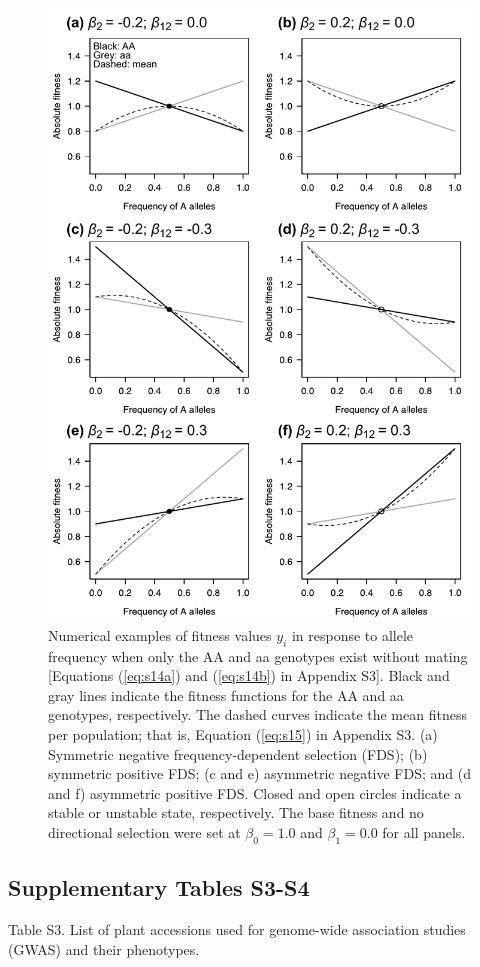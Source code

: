 \documentclass[12pt,]{article}
\begin{document}
\begin{figure}[]
  \includegraphics[width=0.75\linewidth]{AsymFDSinbred.pdf}
  \caption{Numerical examples of fitness values $y_i$ in response to allele frequency when only the AA and aa genotypes exist without mating [Equations (\ref{eq:s14a}) and (\ref{eq:s14b}) in Appendix S3]. Black and gray lines indicate the fitness functions for the AA and aa genotypes, respectively. The dashed curves indicate the mean fitness per population; that is, Equation (\ref{eq:s15}) in Appendix S3. (a) Symmetric negative frequency-dependent selection (FDS); (b) symmetric positive FDS; (c and e) asymmetric negative FDS; and (d and f) asymmetric positive FDS. Closed and open circles indicate a stable or unstable state, respectively. The base fitness and no directional selection were set at $\beta_0=1.0$ and $\beta_1=0.0$ for all panels.}
  \label{figS3:FDSinbred}
\end{figure}

\newpage
\subsection*{Supplementary Tables S3-S4}

\medskip
\noindent
Table S3. List of plant accessions used for genome-wide association studies (GWAS) and their phenotypes.
\end{document}
